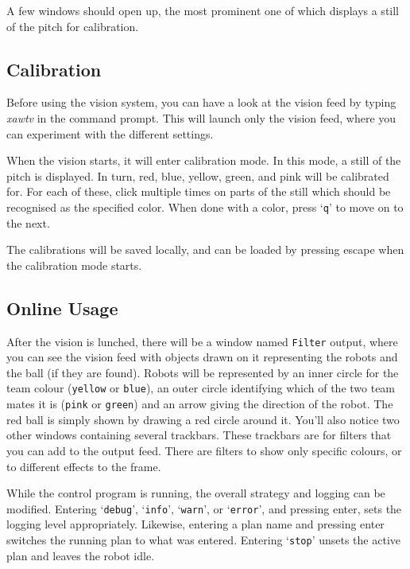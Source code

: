 A few windows should open up, the most prominent one of which displays a still
of the pitch for calibration.

\subsection{Calibration}

Before using the vision system, you can have a look at the vision feed by typing \emph{xawtv} in the command prompt. This will launch only the vision feed, where you can experiment with the different settings.

When the vision starts, it will enter calibration mode. In this mode, a still
of the pitch is displayed. In turn, red, blue, yellow, green, and pink will be
calibrated for. For each of these, click multiple times on parts of the still
which should be recognised as the specified color. When done with a color,
press `\texttt{q}' to move on to the next.

The calibrations will be saved locally, and can be loaded by pressing escape
when the calibration mode starts.

\subsection{Online Usage}

After the vision is lunched, there will be a window named \texttt{Filter} output, where you can see the vision feed with objects drawn on it representing the robots and the ball (if they are found).
Robots will be represented by an inner circle for the team colour (\texttt{yellow} or \texttt{blue}), an outer circle identifying which of the two team mates it is (\texttt{pink} or \texttt{green}) and an arrow giving the direction of the robot. The red ball is simply shown by drawing a red circle around it. You'll also notice two other windows containing several trackbars.
These trackbars are for filters that you can add to the output feed. There are filters to show only specific colours, or to different effects to the frame.

While the control program is running, the overall strategy and logging can be
modified. Entering `\texttt{debug}', `\texttt{info}', `\texttt{warn}', or
`\texttt{error}', and pressing enter, sets the logging level appropriately.
Likewise, entering a plan name and pressing enter switches the running plan to
what was entered. Entering `\texttt{stop}' unsets the active plan and leaves
the robot idle.

